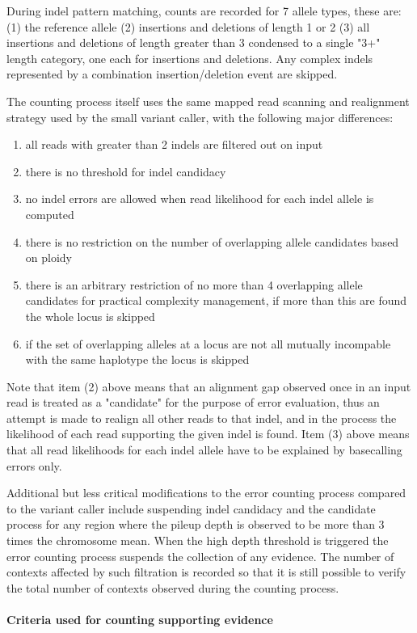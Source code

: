 \documentclass{article}
\begin{document}
During indel pattern matching, counts are recorded for 7 allele types, these are: (1) the reference allele (2) insertions and deletions of length 1 or 2 (3) all insertions and deletions of length greater than 3 condensed to a single "3+" length category, one each for insertions and deletions. Any complex indels represented by a combination insertion/deletion event are skipped.

The counting process itself uses the same mapped read scanning and realignment strategy used by the small variant caller, with the following major differences:
 \begin{enumerate}
 \item all reads with greater than 2 indels are filtered out on input
 \item there is no threshold for indel candidacy
 \item no indel errors are allowed when read likelihood for each indel allele is computed
 \item there is no restriction on the number of overlapping allele candidates based on ploidy
 \item there is an arbitrary restriction of no more than 4 overlapping allele candidates for practical complexity management, if more than this are found the whole locus is skipped
 \item if the set of overlapping alleles at a locus are not all mutually incompable with the same haplotype the locus is skipped
 \end{enumerate}
Note that item (2) above means that an alignment gap observed once in an input read is treated as a "candidate" for the purpose of error evaluation, thus an attempt is made to realign all other reads to that indel, and in the process the likelihood of each read supporting the given indel is found. Item (3) above means that all read likelihoods for each indel allele have to be explained by basecalling errors only.

Additional but less critical modifications to the error counting process compared to the variant caller include suspending indel candidacy and the candidate process for any region where the pileup depth is observed to be more than 3 times the chromosome mean. When the high depth threshold is triggered the error counting process suspends the collection of any evidence. The number of contexts affected by such filtration is recorded so that it is still possible to verify the total number of contexts observed during the counting process.

\paragraph{Criteria used for counting supporting evidence}
\end{document}
